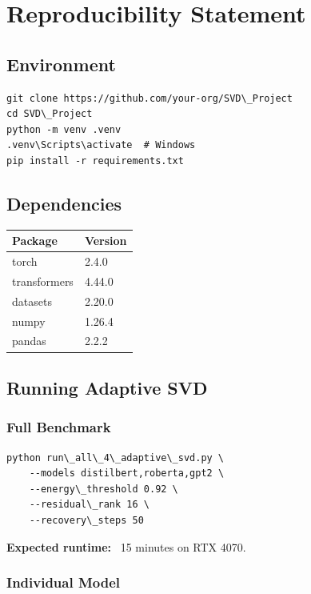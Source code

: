 
\section{Reproducibility Statement}

\subsection{Environment}

\begin{lstlisting}
git clone https://github.com/your-org/SVD\_Project
cd SVD\_Project
python -m venv .venv
.venv\Scripts\activate  # Windows
pip install -r requirements.txt
\end{lstlisting}

\subsection{Dependencies}

\begin{table}[H]
\centering
\small
\begin{tabular}{ll}
\toprule
\textbf{Package} & \textbf{Version} \\
\midrule
torch & 2.4.0 \\
transformers & 4.44.0 \\
datasets & 2.20.0 \\
numpy & 1.26.4 \\
pandas & 2.2.2 \\
\bottomrule
\end{tabular}
\end{table}

\subsection{Running Adaptive SVD}

\subsubsection{Full Benchmark}

\begin{lstlisting}
python run\_all\_4\_adaptive\_svd.py \
    --models distilbert,roberta,gpt2 \
    --energy\_threshold 0.92 \
    --residual\_rank 16 \
    --recovery\_steps 50
\end{lstlisting}

\textbf{Expected runtime:} ~15 minutes on RTX 4070.

\subsubsection{Individual Model}


